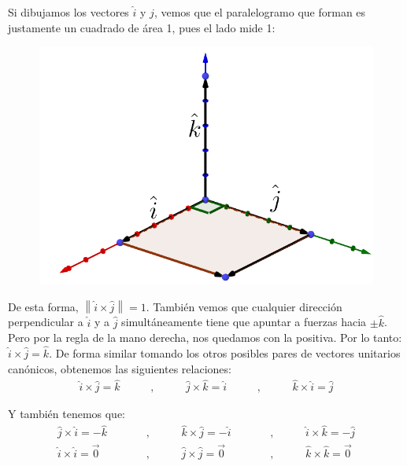 \documentclass[12pt, fleqn]{report}                             %
\DeclareMathOperator \MegaSpace {\quad \quad}                   %
\newcommand{\Abs}[1]{\left\lVert #1 \right\lVert}               %
\begin{document}
            	Si dibujamos los vectores $\hat{i}$ y $\hat{j}$, vemos que el paralelogramo que forman es justamente un cuadrado de área 1, pues el lado mide 1:
            	\begin{figure}[H]
            		\centering
            		\includegraphics[scale=0.6]{unitVectors.png}
            	\end{figure}
            
            	De esta forma, $\Abs{\hat{i} \times \hat{j}} = 1$. También vemos que cualquier dirección perpendicular a $\hat{i}$ y a $\hat{j}$ simultáneamente tiene que apuntar a fuerzas hacia $\pm \hat{k}$. Pero por la regla de la mano derecha, nos quedamos con la positiva. Por lo tanto: $\hat{i} \times \hat{j} = \hat{k}$. De forma similar tomando los otros posibles pares de vectores unitarios canónicos, obtenemos las siguientes relaciones:
            	\begin{align}
	            	\hat{i} \times \hat{j} = \hat{k} \MegaSpace , \MegaSpace \hat{j} \times \hat{k} = \hat{i} \MegaSpace , \MegaSpace \hat{k} \times \hat{i} = \hat{j}
            	\end{align}
            	
            	Y también tenemos que:
            	\begin{align}
            		\hat{j} \times \hat{i} = -\hat{k} \MegaSpace &, \MegaSpace \hat{k} \times \hat{j} = -\hat{i} \MegaSpace &, \MegaSpace \hat{i} \times \hat{k} = -\hat{j}\\
            		\hat{i} \times \hat{i} = \vec{0} \MegaSpace &, \MegaSpace \hat{j} \times \hat{j} = \vec{0} \MegaSpace &, \MegaSpace \hat{k} \times \hat{k} = \vec{0}
            	\end{align}
            	
\end{document}
